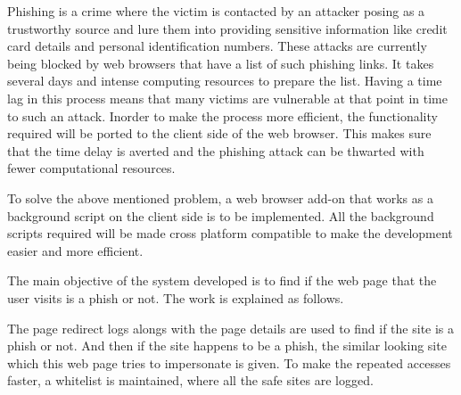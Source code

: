 \par
Phishing is a crime where the victim is contacted by an attacker posing as a trustworthy source and lure them into providing sensitive information like credit card details and personal identification numbers. These attacks are currently being blocked by web browsers that have a list of such phishing links. It takes several days and intense computing resources to prepare the list. Having a time lag in this process means that many victims are vulnerable at that point in time to such an attack. Inorder to make the process more efficient, the functionality required will be ported to the client side of the web browser. This makes sure that the time delay is averted and the phishing attack can be thwarted with fewer computational resources.
\par
To solve the above mentioned problem, a web browser add-on that works as a background script on the client side is to be implemented. All the background scripts required will be made cross platform compatible to make the development easier and more efficient.
\par
The main objective of the system developed is to find if the web page that the user visits is a phish or not. The work is explained as follows.
\par
The page redirect logs alongs with the page details are used to find if the site is a phish or not. And then if the site happens to be a phish, the similar looking site which this web page tries to impersonate is given. To make the repeated accesses faster, a whitelist is maintained, where all the safe sites are logged.